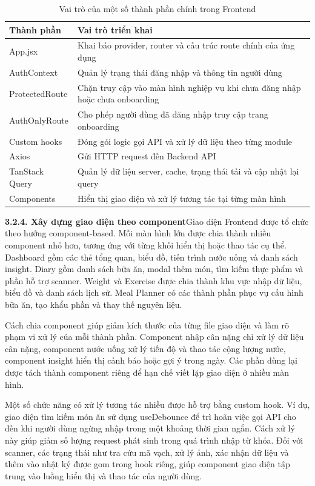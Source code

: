 \begin{table}[H]
\centering
\caption{Vai trò của một số thành phần chính trong Frontend}
\begin{tabular}{|p{4cm}|p{11cm}|}
\hline
\textbf{Thành phần} & \textbf{Vai trò triển khai} \\ \hline
App.jsx & Khai báo provider, router và cấu trúc route chính của ứng dụng \\ \hline
AuthContext & Quản lý trạng thái đăng nhập và thông tin người dùng \\ \hline
ProtectedRoute & Chặn truy cập vào màn hình nghiệp vụ khi chưa đăng nhập hoặc chưa onboarding \\ \hline
AuthOnlyRoute & Cho phép người dùng đã đăng nhập truy cập trang onboarding \\ \hline
Custom hooks & Đóng gói logic gọi API và xử lý dữ liệu theo từng module \\ \hline
Axios & Gửi HTTP request đến Backend API \\ \hline
TanStack Query & Quản lý dữ liệu server, cache, trạng thái tải và cập nhật lại query \\ \hline
Components & Hiển thị giao diện và xử lý tương tác tại từng màn hình \\ \hline
\end{tabular}
\end{table}

\textbf{3.2.4. Xây dựng giao diện theo component}Giao diện Frontend được tổ chức theo hướng component-based. Mỗi màn hình lớn được chia thành nhiều component nhỏ hơn, tương ứng với từng khối hiển thị hoặc thao tác cụ thể. Dashboard gồm các thẻ tổng quan, biểu đồ, tiến trình nước uống và danh sách insight. Diary gồm danh sách bữa ăn, modal thêm món, tìm kiếm thực phẩm và phần hỗ trợ scanner. Weight và Exercise được chia thành khu vực nhập dữ liệu, biểu đồ và danh sách lịch sử. Meal Planner có các thành phần phục vụ cấu hình bữa ăn, tạo khẩu phần và thay thế nguyên liệu.

Cách chia component giúp giảm kích thước của từng file giao diện và làm rõ phạm vi xử lý của mỗi thành phần. Component nhập cân nặng chỉ xử lý dữ liệu cân nặng, component nước uống xử lý tiến độ và thao tác cộng lượng nước, component insight hiển thị cảnh báo hoặc gợi ý trong ngày. Các phần dùng lại được tách thành component riêng để hạn chế viết lặp giao diện ở nhiều màn hình.

Một số chức năng có xử lý tương tác nhiều được hỗ trợ bằng custom hook. Ví dụ, giao diện tìm kiếm món ăn sử dụng useDebounce để trì hoãn việc gọi API cho đến khi người dùng ngừng nhập trong một khoảng thời gian ngắn. Cách xử lý này giúp giảm số lượng request phát sinh trong quá trình nhập từ khóa. Đối với scanner, các trạng thái như tra cứu mã vạch, xử lý ảnh, xác nhận dữ liệu và thêm vào nhật ký được gom trong hook riêng, giúp component giao diện tập trung vào luồng hiển thị và thao tác của người dùng.

